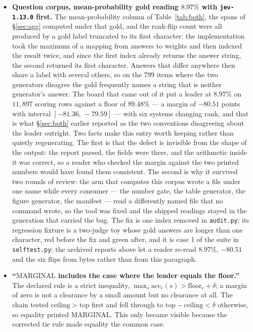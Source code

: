 \documentclass{article}
\newcommand{\ids}[1]{\texttt{\small #1}} %
\begin{document}
\begin{itemize}
\item \textbf{Question corpus, mean-probability gold reading $8.97\%$ with \ids{jev-1.13.0} first.}
The mean-probability column of Table~\ref{tab:both}, the spans of \S\ref{sec:agg} computed under that gold, and the
rank-flip count were all produced by a gold label truncated to its first character: the implementation took the
maximum of a mapping from answers to weights and then indexed the result twice, and since the first index already
returns the answer string, the second returned its first character. Answers that differ anywhere then share a
label with several others, so on the $799$ items where the two generators disagree the gold frequently names a
string that is neither generator's answer. The board that came out of it put a leader at $8.97\%$ on $11,897$
scoring rows against a floor of $89.48\%$ --- a margin of $-80.51$ points with interval $[-81.36,\,-79.59]$ --- with
six systems changing rank, and that is what \S\ref{sec:both} earlier reported as the two conventions disagreeing
about the leader outright. Two facts make this entry worth keeping rather than quietly regenerating. The first
is that the defect is invisible from the shape of the output: the report parsed, the fields were there, and the
arithmetic inside it was correct, so a reader who checked the margin against the two printed numbers would have
found them consistent. The second is why it survived two rounds of review: the arm that computes this corpus wrote
a file under one name while every consumer --- the number gate, the table generator, the figure generator, the
manifest --- read a differently named file that no command wrote, so the tool was fixed and the shipped readings
stayed in the generation that carried the bug. The fix is one index removed in \ids{audit.py}; its regression
fixture is a two-judge toy whose gold answers are longer than one character, red before the fix and green after,
and it is case 1 of the suite in \ids{selftest.py}; the archived reports above let a reader re-read $8.97\%$,
$-80.51$ and the six flips from bytes rather than from this paragraph.
\item \textbf{``$\mathrm{MARGINAL}$ includes the case where the leader equals the floor.''} The declared rule is a strict inequality, $\max_s \mathrm{acc}_c(s) > \mathrm{floor}_c + \delta$; a margin of zero is not a clearance by a small amount but no clearance at all. The chain tested $\mathrm{ceiling} > \mathrm{top}$ first and fell through to $\mathrm{top} - \mathrm{ceiling} < \delta$ otherwise, so equality printed $\mathrm{MARGINAL}$. This only became visible because the corrected tie rule made equality the common case.
\end{itemize}
\end{document}
